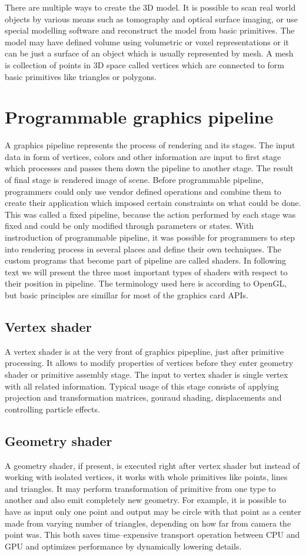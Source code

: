 There are multiple ways to create the 3D model. It is possible to scan real
world objects by various means such as tomography and optical surface imaging,
or use special modelling software and reconstruct the model from basic
primitives. The model may have defined volume using volumetric or voxel
representations or it can be just a surface of an object which is usually
represented by mesh. A mesh is collection of points in 3D space called vertices
which are connected to form basic primitives like triangles or polygons.

\section{Programmable graphics pipeline}
A graphics pipeline represents the process of rendering and its stages. The
input data in form of vertices, colors and other information are input to first stage
which processes and passes them down the pipeline to another stage.
The result of final stage is rendered image of scene. Before programmable
pipeline, programmers could only use vendor defined operations and combine them
to create their application which imposed certain constraints on what could be
done. This was called a fixed pipeline, because the action performed by each
stage was fixed and could be only modified through parameters or states. With
instroduction of programmable pipeline, it was possible for programmers to step
into rendering process in several places and define their own techniques. The
custom programs that become part of pipeline are called shaders. In following
text we will present the three most important types of shaders with respect to
their position in pipeline. The terminology used here is according to OpenGL,
but basic principles are simillar for most of the graphics card APIs.

\subsection{Vertex shader}
A vertex shader is at the very front of graphics pipepline, just after primitive
processing. It allows to modify properties of vertices before they enter
geometry shader or  primitive assembly stage. The input to vertex shader is
single vertex with all related information. Typical usage of this stage consists
of applying projection and transformation matrices, gouraud shading,
displacements and controlling particle effects.

\subsection{Geometry shader}
A geometry shader, if present, is executed right after vertex shader but instead
of working with isolated vertices, it works with whole primitives like points,
lines and triangles. It may perform transformation of primitive from one type to
another and also emit completely new geometry. For example, it is possible to
have as input only one point and output may be circle with that point as a
center made from varying number of triangles, depending on how far from camera
the point was. This both saves time--expensive transport operation between CPU
and GPU and optimizes performance by dynamically lowering details.

